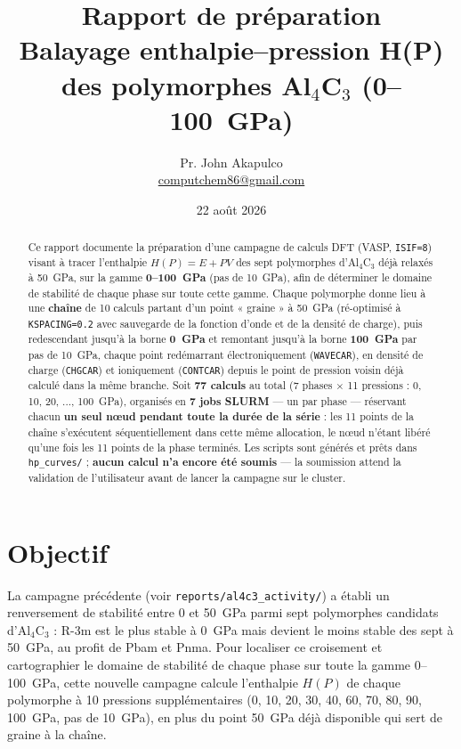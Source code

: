 \documentclass[11pt,a4paper]{article}
\title{\vspace{-1.5cm}Rapport de préparation\\[2pt]
\large Balayage enthalpie--pression H(P) des polymorphes Al$_4$C$_3$ (0--100~GPa)}
\author{Pr. John Akapulco \\ \small \href{mailto:computchem86@gmail.com}{computchem86@gmail.com}}
\date{22 août 2026}
\begin{document}
\maketitle
\vspace{-0.5cm}

\begin{abstract}
\noindent
Ce rapport documente la préparation d'une campagne de calculs DFT (VASP, \texttt{ISIF=8})
visant à tracer l'enthalpie $H(P) = E + PV$ des sept polymorphes d'Al$_4$C$_3$ déjà relaxés à
50~GPa, sur la gamme \textbf{0--100~GPa} (pas de 10~GPa), afin de déterminer le domaine de
stabilité de chaque phase sur toute cette gamme. Chaque polymorphe donne lieu à une
\textbf{chaîne} de 10 calculs partant d'un point « graine » à 50~GPa (ré-optimisé à
\texttt{KSPACING=0.2} avec sauvegarde de la fonction d'onde et de la densité de charge), puis
redescendant jusqu'à la borne \textbf{0~GPa} et remontant jusqu'à la borne \textbf{100~GPa} par
pas de 10~GPa, chaque point redémarrant électroniquement (\texttt{WAVECAR}), en densité de
charge (\texttt{CHGCAR}) et ioniquement (\texttt{CONTCAR}) depuis le point de pression voisin
déjà calculé dans la même branche. Soit \textbf{77 calculs} au total (7 phases $\times$ 11
pressions : 0, 10, 20, ..., 100~GPa), organisés en \textbf{7 jobs SLURM} — un par phase —
réservant chacun \textbf{un seul nœud pendant toute la durée de la série} : les 11 points de
la chaîne s'exécutent séquentiellement dans cette même allocation, le nœud n'étant libéré
qu'une fois les 11 points de la phase terminés. Les scripts sont générés et prêts dans
\texttt{hp\_curves/} ; \textbf{aucun calcul n'a encore été soumis} — la soumission attend la
validation de l'utilisateur avant de lancer la campagne sur le cluster.
\end{abstract}

\section{Objectif}

La campagne précédente (voir \texttt{reports/al4c3\_activity/}) a établi un renversement de
stabilité entre 0 et 50~GPa parmi sept polymorphes candidats d'Al$_4$C$_3$ : R-3m est le plus
stable à 0~GPa mais devient le moins stable des sept à 50~GPa, au profit de Pbam et Pnma. Pour
localiser ce croisement et cartographier le domaine de stabilité de chaque phase sur toute la
gamme 0--100~GPa, cette nouvelle campagne calcule l'enthalpie $H(P)$ de chaque polymorphe à 10
pressions supplémentaires (0, 10, 20, 30, 40, 60, 70, 80, 90, 100~GPa, pas de 10~GPa), en plus
du point 50~GPa déjà disponible qui sert de graine à la chaîne.
\end{document}

